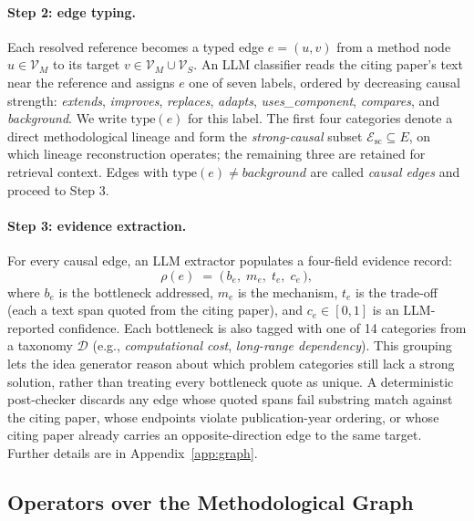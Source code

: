 \documentclass{opendatalab}
\begin{document}
\paragraph{Step 2: edge typing.}
Each resolved reference becomes a typed edge $e = (u, v)$ from a method node $u \in \mathcal{V}_M$ to its target $v \in \mathcal{V}_M \cup \mathcal{V}_S$. An LLM classifier reads the citing paper's text near the reference and assigns $e$ one of seven labels, ordered by decreasing causal strength: \emph{extends}, \emph{improves}, \emph{replaces}, \emph{adapts}, \emph{uses\_component}, \emph{compares}, and \emph{background}. We write $\text{type}(e)$ for this label. The first four categories denote a direct methodological lineage and form the \emph{strong-causal} subset $\mathcal{E}_{\text{sc}} \subseteq E$, on which lineage reconstruction operates; the remaining three are retained for retrieval context. Edges with $\text{type}(e) \neq \textit{background}$ are called \emph{causal edges} and proceed to Step 3.

\paragraph{Step 3: evidence extraction.}
For every causal edge, an LLM extractor populates a four-field evidence record:
\begin{equation}
\rho(e) \;=\; \bigl(\,b_e,\;m_e,\;t_e,\;c_e\,\bigr),
\label{eq:rho}
\end{equation}
where $b_e$ is the bottleneck addressed, $m_e$ is the mechanism, $t_e$ is the trade-off (each a text span quoted from the citing paper), and $c_e \in [0, 1]$ is an LLM-reported confidence. Each bottleneck is also tagged with one of 14 categories from a taxonomy $\mathcal{D}$ (e.g., \emph{computational cost}, \emph{long-range dependency}). This grouping lets the idea generator reason about which problem categories still lack a strong solution, rather than treating every bottleneck quote as unique. A deterministic post-checker discards any edge whose quoted spans fail substring match against the citing paper, whose endpoints violate publication-year ordering, or whose citing paper already carries an opposite-direction edge to the same target. Further details are in Appendix~\ref{app:graph}.


\subsection{Operators over the Methodological Graph}
\label{sec:operators}
\end{document}
